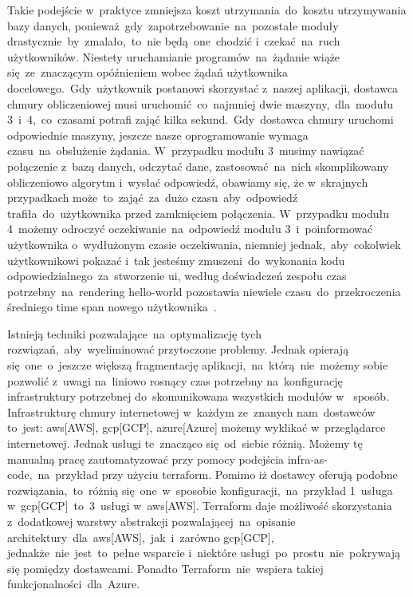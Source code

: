 Takie podejście w~praktyce zmniejsza koszt utrzymania~do~kosztu utrzymywania bazy danych, ponieważ~gdy~zapotrzebowanie~na~pozostałe moduły drastycznie~by~zmalało,~to~nie będą~one~chodzić i~czekać~na~ruch użytkowników.
Niestety uruchamianie programów~na~żądanie wiąże się~ze~znaczącym opóźnieniem wobec żądań użytkownika docelowego.~Gdy~użytkownik postanowi skorzystać z~naszej aplikacji, dostawca chmury obliczeniowej musi uruchomić~co~najmniej dwie maszyny,~dla~modułu 3~i~4,~co~czasami potrafi zająć kilka sekund.~Gdy~dostawca chmury uruchomi odpowiednie maszyny, jeszcze nasze oprogramowanie wymaga czasu~na~obsłużenie żądania.
W~przypadku modułu 3~musimy nawiązać połączenie z~bazą danych, odczytać dane, zastosować~na~nich skomplikowany obliczeniowo algorytm i~wysłać odpowiedź, obawiamy się, że w~skrajnych przypadkach może~to~zająć~za~dużo czasu~aby~odpowiedź trafiła~do~użytkownika przed zamknięciem połączenia.
W~przypadku modułu 4~możemy odroczyć oczekiwanie~na~odpowiedź modułu 3~i~poinformować użytkownika o~wydłużonym czasie oczekiwania, niemniej jednak,~aby~cokolwiek użytkownikowi pokazać i~tak jesteśmy zmuszeni~do~wykonania kodu odpowiedzialnego~za~stworzenie \gls{ui}, według doświadczeń zespołu czas potrzebny~na~\gls{rendering} \gls{hello-world} pozostawia niewiele czasu~do~przekroczenia średniego time span nowego użytkownika~\cite{timespan}.

Istnieją techniki pozwalające~na~optymalizację tych rozwiązań,~aby~wyeliminować przytoczone problemy.
Jednak opierają się~one~o~jeszcze większą fragmentację aplikacji,~na~którą~nie~możemy sobie pozwolić z~uwagi na~liniowo rosnący czas potrzebny na~konfigurację infrastruktury potrzebnej do~skomunikowana wszystkich modułów w~ sposób.
Infrastrukturę chmury internetowej w~każdym ze~znanych nam~dostawców to~jest: \acrshort{aws}[AWS], \acrshort{gcp}[GCP], \acrshort{azure}[Azure] możemy wyklikać w~przeglądarce internetowej.
Jednak usługi te~znacząco się~od~siebie różnią.
Możemy tę manualną pracę zautomatyzować przy pomocy podejścia \gls{infra-as-code},~na~przykład przy użyciu terraform.
Pomimo iż dostawcy oferują podobne rozwiązania,~to~różnią się~one~w~sposobie konfiguracji,~na~przykład 1~usługa w~\acrshort{gcp}[GCP]~to~3~usługi w~\acrshort{aws}[AWS]\@.
Terraform daje możliwość skorzystania z~dodatkowej warstwy abstrakcji pozwalającej~na~opisanie architektury~dla~\acrshort{aws}[AWS],~jak~i~zarówno \acrshort{gcp}[GCP], jednakże~nie~jest~to~pełne wsparcie i~niektóre usługi~po~prostu~nie~pokrywają się pomiędzy dostawcami.
Ponadto Terraform~nie~wspiera takiej funkcjonalności~dla~Azure.

